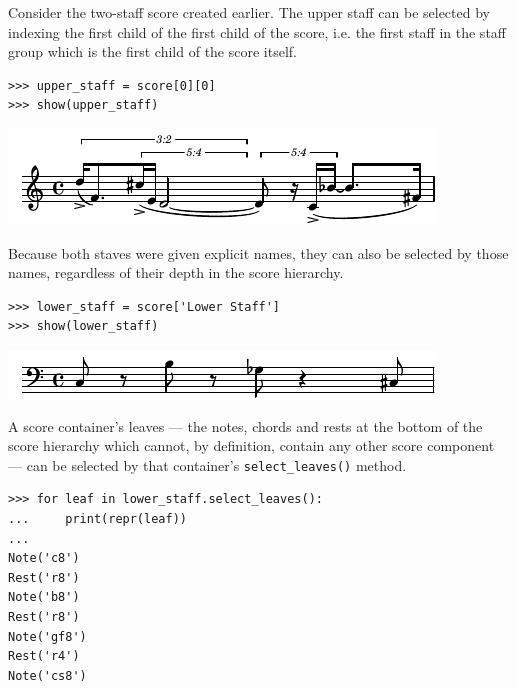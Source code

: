 \documentclass{article}
\begin{document}
Consider the two-staff score created earlier. The upper staff can be selected
by indexing the first child of the first child of the score, i.e. the first
staff in the staff group which is the first child of the score itself.

\begin{lstlisting}
>>> upper_staff = score[0][0]
>>> show(upper_staff)
\end{lstlisting}
\includegraphics{assets/lilypond-dcce2b5927dd4f606034c3efcde7da2e.pdf}

Because both staves were given explicit names, they can also be selected by
those names, regardless of their depth in the score hierarchy.

\begin{lstlisting}
>>> lower_staff = score['Lower Staff']
>>> show(lower_staff)
\end{lstlisting}
\includegraphics{assets/lilypond-fa746e527d218a814e36af2f46d314bb.pdf}

A score container's leaves --- the notes, chords and rests at the bottom of the
score hierarchy which cannot, by definition, contain any other score component
--- can be selected by that container's \texttt{select\_leaves()} method.

\begin{lstlisting}
>>> for leaf in lower_staff.select_leaves():
...     print(repr(leaf))
...
Note('c8')
Rest('r8')
Note('b8')
Rest('r8')
Note('gf8')
Rest('r4')
Note('cs8')
\end{lstlisting}
\end{document}
